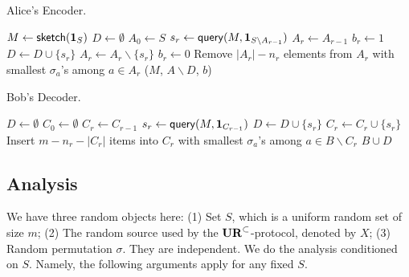 \begin{algorithm}[H] 
  \caption{Alice's Encoder.} \label{algo:enc}
  \begin{algorithmic}[1]
    \State $M \leftarrow \mathsf{sketch}(\mathbf{1}_S)$
    \State $D\leftarrow \emptyset$
    \State $A_0 \leftarrow S$
      \State $s_r\leftarrow \mathsf{query}(M, \mathbf{1}_{S\backslash A_{r-1}})$
      \State $A_r\leftarrow A_{r-1}$
       
        \State $b_r\leftarrow 1$ 
        \State $D\leftarrow D \cup \{s_r\}$
        \State $A_r\leftarrow A_r \backslash \{s_r\}$
      \Else 
        \State $b_r\leftarrow 0$
      \EndIf
      \State Remove $|A_r|-n_r$ elements from $A_r$ with smallest $\sigma_a$'s among $a\in A_r$ 
    \EndFor
    \State \Return ($M$, $A\backslash D$, $b$) 
    \EndProcedure
  \end{algorithmic}
\end{algorithm}

\begin{algorithm}[H] 
  \caption{Bob's Decoder.} \label{algo:dec}
  \begin{algorithmic}[1]
    \State $D\leftarrow \emptyset$
    \State $C_0 \leftarrow \emptyset$
      \State $C_r\leftarrow C_{r-1}$
        \State $s_r\leftarrow \mathsf{query}(M, \mathbf{1}_{C_{r-1}})$ 
        \State $D\leftarrow D \cup \{s_r\}$
        \State $C_r\leftarrow C_r \cup \{s_r\}$
      \EndIf
       \State Insert $m-n_r-|C_r|$ items into $C_r$ with smallest $\sigma_a$'s among $a\in B\backslash C_r$
    \EndFor
    \State \Return $B\cup D$ 
    \EndProcedure
  \end{algorithmic}
\end{algorithm}

\subsection{Analysis}

We have three random objects here: 
(1) Set $S$, which is a uniform random set of size $m$; 
(2) The random source used by the $\mathbf{UR}^\subset$-protocol, denoted by $X$; 
(3) Random permutation $\sigma$. 
They are independent. 
We do the analysis conditioned on $S$. 
Namely, the following arguments apply for any fixed $S$. 

